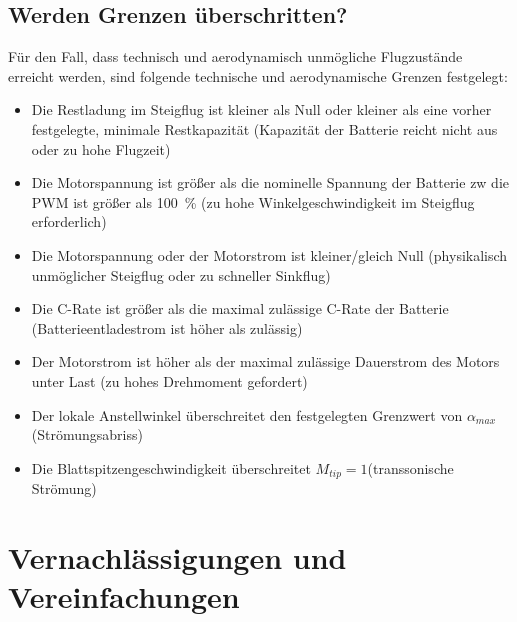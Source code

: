 \subsection{Werden Grenzen überschritten?}
Für den Fall, dass technisch und aerodynamisch unmögliche Flugzustände erreicht werden, sind folgende technische und aerodynamische Grenzen festgelegt:
\begin{itemize}
	\item Die Restladung im Steigflug ist kleiner als  Null oder kleiner als eine vorher festgelegte, minimale Restkapazität (Kapazität der Batterie reicht nicht aus oder zu hohe Flugzeit)
	\item Die Motorspannung ist größer als die nominelle Spannung der Batterie zw die PWM ist größer als \SI{100}{\%} (zu hohe Winkelgeschwindigkeit im Steigflug erforderlich)
	\item Die Motorspannung oder der Motorstrom ist kleiner/gleich Null (physikalisch unmöglicher Steigflug oder zu schneller Sinkflug)
	\item Die C-Rate ist größer als die maximal zulässige C-Rate der Batterie (Batterieentladestrom ist höher als zulässig)
	\item Der Motorstrom ist höher als der maximal zulässige Dauerstrom des Motors unter Last (zu hohes Drehmoment gefordert)
	\item Der lokale Anstellwinkel überschreitet den festgelegten Grenzwert von \ensuremath{\alpha_{max}}(Strömungsabriss)
	\item Die Blattspitzengeschwindigkeit überschreitet \ensuremath{M_{tip}=1}(transsonische Strömung)
\end{itemize}

\section{Vernachlässigungen und Vereinfachungen}
\label{sec:vernachlaessigungen_vereinfachungen}

